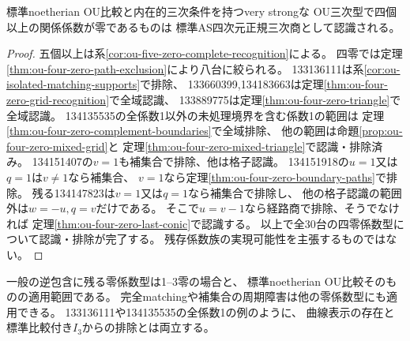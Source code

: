 \begin{corollary}
\label{cor:ou-four-zero-complete-recognition}
標準noetherian OU比較と内在的三次条件を持つvery strongな
OU三次型で四個以上の関係係数が零であるものは
標準AS四次元正規三次商として認識される。
\end{corollary}
\begin{proof}
五個以上は系\ref{cor:ou-five-zero-complete-recognition}による。
四零では定理\ref{thm:ou-four-zero-path-exclusion}により八台に絞られる。
133136111は系\ref{cor:ou-isolated-matching-supports}で排除、
133660399,134183663は定理\ref{thm:ou-four-zero-grid-recognition}で全域認識、
133889775は定理\ref{thm:ou-four-zero-triangle}で全域認識。
134135535の全係数1以外の未処理境界を含む係数1の範囲は
定理\ref{thm:ou-four-zero-complement-boundaries}で全域排除、
他の範囲は命題\ref{prop:ou-four-zero-mixed-grid}と
定理\ref{thm:ou-four-zero-mixed-triangle}で認識・排除済み。
134151407の$v=1$も補集合で排除、他は格子認識。
134151918の$u=1$又は$q=1$は$v\ne1$なら補集合、
$v=1$なら定理\ref{thm:ou-four-zero-boundary-paths}で排除。
残る134147823は$v=1$又は$q=1$なら補集合で排除し、
他の格子認識の範囲外は$w=-u,q=v$だけである。
そこで$u=v-1$なら経路商で排除、そうでなければ
定理\ref{thm:ou-four-zero-last-conic}で認識する。
以上で全30台の四零係数型について認識・排除が完了する。
残存係数族の実現可能性を主張するものではない。
\end{proof}

\begin{remark}
一般の逆包含に残る零係数型は1--3零の場合と、
標準noetherian OU比較そのものの適用範囲である。
完全matchingや補集合の周期障害は他の零係数型にも適用できる。
133136111や134135535の全係数1の例のように、
曲線表示の存在と標準比較付き$I_3$からの排除とは両立する。
\end{remark}


